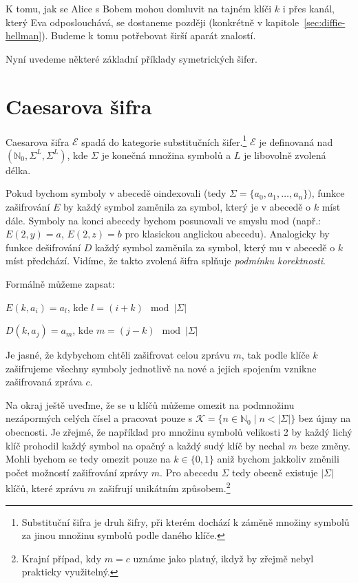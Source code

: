 \documentclass[12pt]{article}
\begin{document}
    K tomu, jak se Alice s Bobem mohou domluvit na tajném klíči $k$ i přes kanál, který 
    Eva odposlouchává, se dostaneme později (konkrétně v kapitole~\ref{sec:diffie-hellman}).
    Budeme k tomu potřebovat širší aparát znalostí.

    Nyní uvedeme některé základní příklady symetrických šifer.


\section{Caesarova šifra}
    Caesarova šifra $\mathcal{E}$ spadá do kategorie substitučních šifer.\footnote{Substituční šifra je druh šifry, při kterém dochází k záměně
    množiny symbolů za jinou množinu symbolů podle daného klíče.}
    $\mathcal{E}$ je definovaná nad $(\mathbb{N}_0,\Sigma^L,\Sigma^L)$, kde $\Sigma$
    je konečná množina symbolů a $L$ je libovolně zvolená délka.

    Pokud bychom symboly v abecedě oindexovali (tedy $\Sigma = \{a_0, a_1, \ldots, a_n\})$, funkce zašifrování $E$ by každý symbol zaměnila za
    symbol, který je v abecedě o $k$ míst dále. Symboly na konci abecedy bychom posunovali ve smyslu mod
    (např.: $E(2, y)= a$, $E(2, z)= b$ pro klasickou anglickou abecedu). Analogicky by 
    funkce dešifrování $D$ každý symbol zaměnila za symbol, který mu v abecedě o $k$ míst předchází.
    Vidíme, že takto zvolená šifra splňuje \emph{podmínku korektnosti}.

    \medskip

    Formálně můžeme zapsat:

    \begin{center}
        $E(k, a_i) = a_l$, kde $l = (i+k)\mod{|\Sigma|}$

        $D(k, a_j) = a_m$, kde $m = (j-k)\mod{|\Sigma|}$
    \end{center}

    Je jasné, že kdybychom chtěli zašifrovat celou zprávu $m$, tak podle klíče $k$ zašifrujeme všechny symboly jednotlivě na nové a
    jejich spojením vznikne zašifrovaná zpráva $c$.
    
    \bigskip
    Na okraj ještě uveďme, že se u klíčů můžeme omezit na podmnožinu nezápormých celých čísel a pracovat pouze s
    $\mathcal{K} =\{n \in \mathbb{N}_0 \mid n < |\Sigma|\}$
    bez újmy na obecnosti. Je zřejmé, že například pro množinu symbolů velikosti 2 by každý lichý klíč prohodil
    každý symbol na opačný a každý sudý klíč by nechal $m$ beze změny. Mohli bychom se tedy omezit pouze na $k \in \{0,1\}$
    aniž bychom jakkoliv změnili počet možností zašifrování zprávy $m$.
    Pro abecedu $\Sigma$ tedy obecně existuje $|\Sigma|$ klíčů, které zprávu $m$ zašifrují unikátním způsobem.\footnote{Krajní případ, kdy $m = c$
    uznáme jako platný, ikdyž by zřejmě nebyl prakticky využitelný.}
\end{document}
